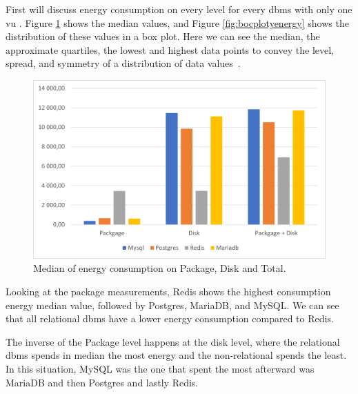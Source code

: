 
    First will discuss energy consumption on every level for every \gls{dbms} with only one \gls{vu} . Figure \ref{fig:medianenergy} shows the median values, and Figure \ref{fig:bocplotyenergy} shows the distribution of these values in a box plot. Here we can see the median, the approximate quartiles, the lowest and highest data points to convey the level, spread, and symmetry of a distribution of data values~\cite{doi:10.7326/0003-4819-110-11-916}.

\begin{figure}[H]
\centering
\includegraphics[width=0.8\columnwidth]{results/median/energy.png}
\caption{Median of energy consumption on Package, Disk and Total.}
\label{fig:medianenergy}
\end{figure}

     Looking at the package measurements, Redis shows the highest consumption energy median value, followed by  Postgres, MariaDB, and MySQL. We can see that all relational \gls{dbms} have a lower energy consumption compared to Redis.
	
    The inverse of the Package level happens at the disk level, where the relational \gls{dbms} spends in median the most energy and the non-relational spends the least. In this situation, MySQL was the one that spent the most afterward was MariaDB and then Postgres and lastly Redis.

